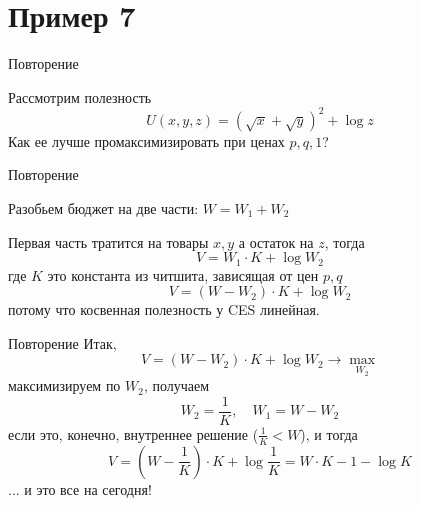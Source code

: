 \documentclass{beamer}
\begin{document}
\section{Пример 7}

\begin{frame}{Повторение}

Рассмотрим полезность
$$ U(x,y,z) =  (\sqrt{x} + \sqrt{y})^2 + \log z $$
Как ее лучше промаксимизировать при ценах $p,q,1$?

\end{frame}

\begin{frame}{Повторение}

Разобьем бюджет на две части: $W = W_1 + W_2$

Первая часть тратится на товары $x,y$ а остаток на $z$, тогда
$$V = W_1 \cdot K + \log W_2$$
где $K$ это константа из читшита, зависящая от цен $p,q$
$$V = (W - W_2) \cdot K + \log W_2$$
потому что косвенная полезность у CES линейная.
\end{frame}

\begin{frame}{Повторение}
Итак,
$$V = (W - W_2) \cdot K + \log W_2 \to \max_{W_2}$$
максимизируем по $W_2$, получаем
$$ W_2 = \frac{1}{K}, \quad W_1 = W - W_2$$
если это, конечно, внутреннее решение ($\frac{1}{K} < W$), и тогда
$$ V = (W - \frac{1}{K})\cdot K + \log{\frac{1}{K}} = W \cdot K - 1 - \log K$$
... и это все на сегодня!
\end{frame}
\end{document}
